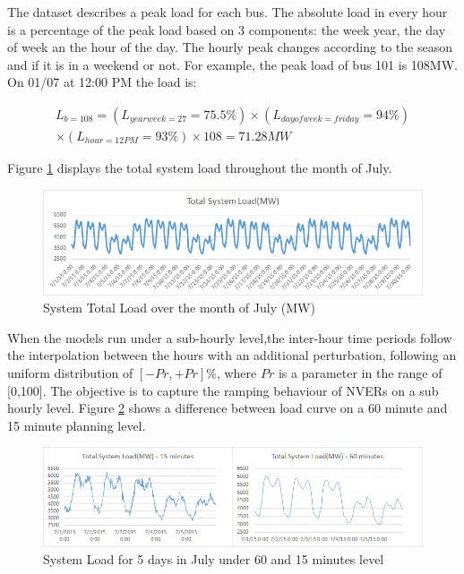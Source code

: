 \documentclass[12pt,LUDisStyle,twosided]{book}
\begin{document}
The dataset describes a peak load for each bus. The absolute load in every hour is a percentage of the peak load based on 3 components: the week year, the day of week an the hour of the day. The hourly peak changes according to the season and if it is in a weekend or not. For example, the peak load of bus 101 is 108MW. On 01/07 at 12:00 PM the load is:

\begin{multline}
L_{b = 108} =  (L_{yearweek = 27} = 75.5\%) \times (L_{dayofweek = friday} = 94\%) 
\\ \times (L_{hour= 12 PM} = 93\%) \times 108 = 71.28MW
\end{multline}

Figure \ref{fig:totalSystemLoadJuly} displays the total system load throughout the month of July.

\begin{figure}[h!] 
  \includegraphics[width=\textwidth,keepaspectratio]{totalSystemLoadJuly.png}
  \caption{System Total Load over the month of July (MW)}
  \label{fig:totalSystemLoadJuly}
\end{figure}

When the models run under a sub-hourly level,the inter-hour time periods follow the interpolation between the hours with an additional perturbation, following an uniform distribution of $[-Pr,+Pr]\%$, where $Pr$ is a parameter in the range of [0,100]. The objective is to capture the ramping behaviour of NVERs on a sub hourly level. Figure \ref{fig:perturbationDifference} shows a difference between load curve on a 60 minute and 15 minute planning level. 

\begin{figure}[h!] 
  \includegraphics[width=\textwidth,keepaspectratio]{perturbationDifference.png}
  \caption{System Load for 5 days in July under 60 and 15 minutes level}
  \label{fig:perturbationDifference}
\end{figure}
\end{document}
